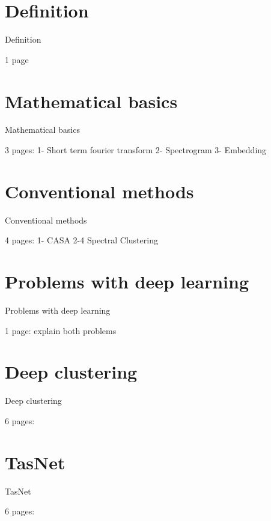 \documentclass[xcolor=table,mathserif,9pt]{beamer}    %
\begin{document}
\section{Definition}%
\label{sec:definition}
\begin{frame}{Definition}

1 page
\end{frame}

\section{Mathematical basics}%
\label{sec:mathematical_basics}
\begin{frame}{Mathematical basics}

3 pages:
	1- Short term fourier transform
	2- Spectrogram
	3- Embedding
\end{frame}

\section{Conventional methods}%
\label{sec:conventional_methods}
\begin{frame}{Conventional methods}

4 pages:
	1- CASA
	2-4 Spectral Clustering
\end{frame}

\section{Problems with deep learning}%
\label{sec:problems_with_deep_learning}
\begin{frame}{Problems with deep learning}

1 page: explain both problems
\end{frame}

\section{Deep clustering}%
\label{sec:deep_clustering}
\begin{frame}{Deep clustering}

6 pages:
\end{frame}

\section{TasNet}%
\label{sec:tasnet}
\begin{frame}{TasNet}

6 pages:
\end{frame}
\end{document}
